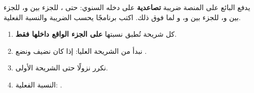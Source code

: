 \begin{statement}
يدفع البائع على المنصة ضريبة \textbf{تصاعدية} على دخله السنوي:  حتى ،  للجزء بين  و،  للجزء بين  و،  للجزء بين  و، و لما فوق ذلك. اكتب برنامجًا يحسب الضريبة والنسبة الفعلية.
\end{statement}
\begin{stepsbox}\begin{enumerate}
\item كل شريحة تُطبق نسبتها \textbf{على الجزء الواقع داخلها فقط}.
\item نبدأ من الشريحة العليا: إذا كان  نضيف  ونضع .
\item نكرر نزولًا حتى الشريحة الأولى.
\item النسبة الفعلية: .
\end{enumerate}\end{stepsbox}
